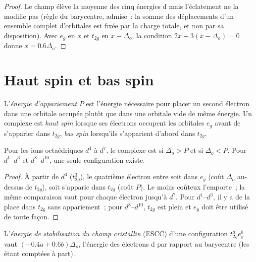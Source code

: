 \begin{proof}
Le champ élève la moyenne des cinq énergies d mais l'éclatement ne la modifie pas
(règle du barycentre, admise~: la somme des déplacements d'un ensemble complet
d'orbitales est fixée par la charge totale, et non par sa disposition). Avec $e_g$ en $x$ et
$t_{2g}$ en $x - \Delta_o$, la condition $2x + 3(x - \Delta_o) = 0$ donne $x = 0.6\Delta_o$.
\end{proof}

\section{Haut spin et bas spin}

\begin{definition}\label{def:b2:ligand-field:spin}
L'\emph{énergie d'appariement} $P$ est l'énergie nécessaire pour placer un second
électron dans une orbitale occupée plutôt que dans une orbitale vide de même énergie. Un
complexe est \emph{haut spin} lorsque ses électrons occupent les orbitales $e_g$
avant de s'apparier dans $t_{2g}$, \emph{bas spin} lorsqu'ils s'apparient d'abord dans $t_{2g}$.
\end{definition}

\begin{proposition}\label{prop:b2:ligand-field:spin-state}
Pour les ions octaédriques $d^4$ à $d^7$, le complexe est  si $\Delta_o > P$ et 
si $\Delta_o < P$. Pour $d^1$--$d^3$ et $d^8$--$d^{10}$, une seule configuration existe.
\end{proposition}

\begin{proof}
À partir de $d^3$ ($t_{2g}^3$), le quatrième électron entre soit dans $e_g$ (coût $\Delta_o$ au-dessus de
$t_{2g}$), soit s'apparie dans $t_{2g}$ (coût $P$). Le moins coûteux l'emporte~; la même comparaison vaut
pour chaque électron jusqu'à $d^7$. Pour $d^1$--$d^3$, il y a de la place dans $t_{2g}$ sans appariement~;
pour $d^8$--$d^{10}$, $t_{2g}$ est plein et $e_g$ doit être utilisé de toute façon.
\end{proof}

\begin{definition}\label{def:b2:ligand-field:cfse}
L'\emph{énergie de stabilisation du champ cristallin}
(ESCC) d'une configuration $t_{2g}^ae_g^b$ vaut $(-0.4a + 0.6b)\Delta_o$, l'énergie des
électrons d par rapport au barycentre (les  étant comptées à part).
\end{definition}

